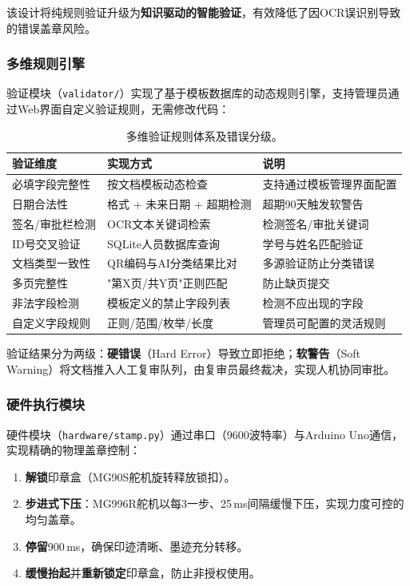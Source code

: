 \documentclass[conference]{IEEEtran}
\begin{document}
\noindent 该设计将纯规则验证升级为\textbf{知识驱动的智能验证}，有效降低了因OCR误识别导致的错误盖章风险。

\subsubsection{多维规则引擎}

验证模块（\texttt{validator/}）实现了基于模板数据库的动态规则引擎，支持管理员通过Web界面自定义验证规则，无需修改代码：

\begin{table}[H]
\centering
\caption{多维验证规则体系及错误分级。}
\label{tab:validation}
\begin{tabular}{@{}llp{4cm}@{}}
\toprule
\textbf{验证维度} & \textbf{实现方式} & \textbf{说明} \\
\midrule
必填字段完整性 & 按文档模板动态检查 & 支持通过模板管理界面配置 \\
日期合法性 & 格式 + 未来日期 + 超期检测 & 超期90天触发软警告 \\
签名/审批栏检测 & OCR文本关键词检索 & 检测签名/审批关键词 \\
ID号交叉验证 & SQLite人员数据库查询 & 学号与姓名匹配验证 \\
文档类型一致性 & QR编码与AI分类结果比对 & 多源验证防止分类错误 \\
多页完整性 & "第X页/共Y页"正则匹配 & 防止缺页提交 \\
非法字段检测 & 模板定义的禁止字段列表 & 检测不应出现的字段 \\
自定义字段规则 & 正则/范围/枚举/长度 & 管理员可配置的灵活规则 \\
\bottomrule
\end{tabular}
\end{table}

\noindent 验证结果分为两级：\textbf{硬错误}（Hard Error）导致立即拒绝；\textbf{软警告}（Soft Warning）将文档推入人工复审队列，由复审员最终裁决，实现人机协同审批。

\subsubsection{硬件执行模块}

硬件模块（\texttt{hardware/stamp.py}）通过串口（9600波特率）与Arduino Uno通信，实现精确的物理盖章控制：

\begin{enumerate}[leftmargin=*]
    \item \textbf{解锁}印章盒（MG90S舵机旋转释放锁扣）。
    \item \textbf{步进式下压}：MG996R舵机以每3\textdegree{}一步、25\,ms间隔缓慢下压，实现力度可控的均匀盖章。
    \item \textbf{停留}900\,ms，确保印迹清晰、墨迹充分转移。
    \item \textbf{缓慢抬起}并\textbf{重新锁定}印章盒，防止非授权使用。
\end{enumerate}
\end{document}
